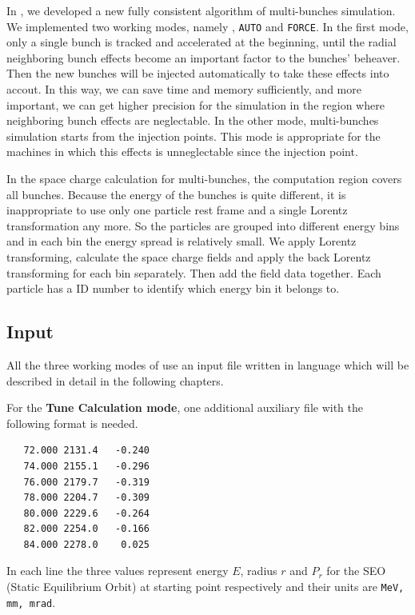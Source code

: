 In \opalcycl, we developed a new fully consistent algorithm of multi-bunches simulation.  We implemented two working modes, namely ,
\texttt{AUTO} and \texttt{FORCE}. In the first mode, only a single bunch is tracked and accelerated at the beginning,
until the radial neighboring bunch effects become an important factor to the bunches' beheaver. Then the new bunches will be injected automatically to
take these effects into accout. In this way, we can save time and memory sufficiently, and more important,
we can get higher precision for the simulation in the region where neighboring bunch effects are neglectable.
In the other mode, multi-bunches simulation starts from the injection points. This mode is appropriate for the machines in which this effects is
unneglectable since the injection point.

In the space charge calculation for multi-bunches, the computation region covers all bunches.
Because the energy of the bunches is quite different, it is inappropriate to use only one particle rest frame and a single Lorentz transformation any more.
So the particles are grouped into different energy bins and in each bin the energy spread is relatively small. We apply Lorentz transforming, calculate
the space charge fields and apply the back Lorentz transforming for each bin separately. Then add the field data together. Each particle has a ID number to identify
which energy bin it belongs to.

\subsection{Input}
All the three working modes of \opalcycl use an input file written in \mad language which will be described in detail in the following chapters.

For the  {\bfseries Tune Calculation mode}, one additional auxiliary file with the following format is needed.
\begin{verbatim}
   72.000 2131.4   -0.240
   74.000 2155.1   -0.296
   76.000 2179.7   -0.319
   78.000 2204.7   -0.309
   80.000 2229.6   -0.264
   82.000 2254.0   -0.166
   84.000 2278.0    0.025
\end{verbatim}
In each line the three values represent energy $E$, radius $r$ and $P_r$ for the SEO (Static Equilibrium Orbit)
at starting point respectively and their units are {\tt MeV,  mm,  mrad}.

